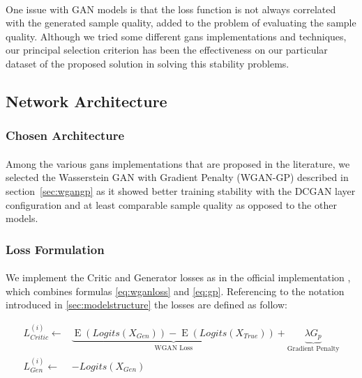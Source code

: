 \paragraph{} One issue with GAN models is that the loss function is not always correlated with the generated sample quality, added to the problem of evaluating the sample quality. Although we tried some different \glspl{gan} implementations and techniques, our principal selection criterion has been the effectiveness on our particular dataset of the proposed solution in solving this stability problems.

\subsection{Network Architecture}
\label{sec:networkarch}

\subsubsection{Chosen Architecture} 
\paragraph{} Among the various \glspl{gan} implementations that are proposed in the literature, we selected the Wasserstein GAN with Gradient Penalty \cite{wgangp} (WGAN-GP) described in section~\ref{sec:wgangp} as it showed better training stability with the DCGAN layer configuration and at least comparable sample quality as opposed to the other models.


\subsubsection{Loss Formulation}
\paragraph{} We implement the Critic and Generator losses as in the  official implementation \cite{wgangp-imple}, which combines formulas \ref{eq:wganloss} and \ref{eq:gp}. Referencing to the notation introduced in \ref{sec:modelstructure} the losses are defined as follow:

\begin{equation}
\label{eq:loss}
\begin{split}
L_{Critic}^{(i)} \gets & \underbrace{\operatorname{E}(Logits(X_{Gen})) - \operatorname{E}(Logits(X_{True}))}_{\text{WGAN Loss}} + \underbrace {\lambda G_p}_{\text{Gradient Penalty}} \\
L_{Gen}^{(i)} \gets & -Logits(X_{Gen}) 
\end{split}
\end{equation}

